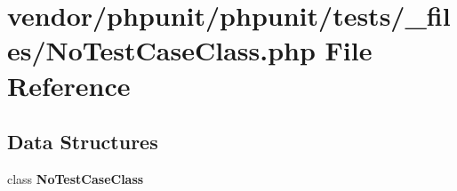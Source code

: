 \section{vendor/phpunit/phpunit/tests/\+\_\+files/\+No\+Test\+Case\+Class.php File Reference}
\label{_no_test_case_class_8php}
\subsection*{Data Structures}
\begin{DoxyCompactItemize}
\item 
class {\bf No\+Test\+Case\+Class}
\end{DoxyCompactItemize}
